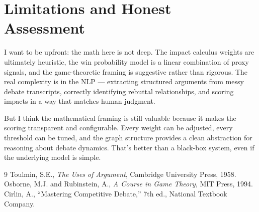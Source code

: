 \documentclass[11pt]{article}
\begin{document}
\section{Limitations and Honest Assessment}

I want to be upfront: the math here is not deep. The impact calculus weights are ultimately heuristic, the win probability model is a linear combination of proxy signals, and the game-theoretic framing is suggestive rather than rigorous. The real complexity is in the NLP --- extracting structured arguments from messy debate transcripts, correctly identifying rebuttal relationships, and scoring impacts in a way that matches human judgment.

But I think the mathematical framing is still valuable because it makes the scoring transparent and configurable. Every weight can be adjusted, every threshold can be tuned, and the graph structure provides a clean abstraction for reasoning about debate dynamics. That's better than a black-box system, even if the underlying model is simple.

\begin{thebibliography}{9}
 Toulmin, S.E., \textit{The Uses of Argument}, Cambridge University Press, 1958.
 Osborne, M.J. and Rubinstein, A., \textit{A Course in Game Theory}, MIT Press, 1994.
 Cirlin, A., ``Mastering Competitive Debate,'' 7th ed., National Textbook Company.
\end{thebibliography}
\end{document}
